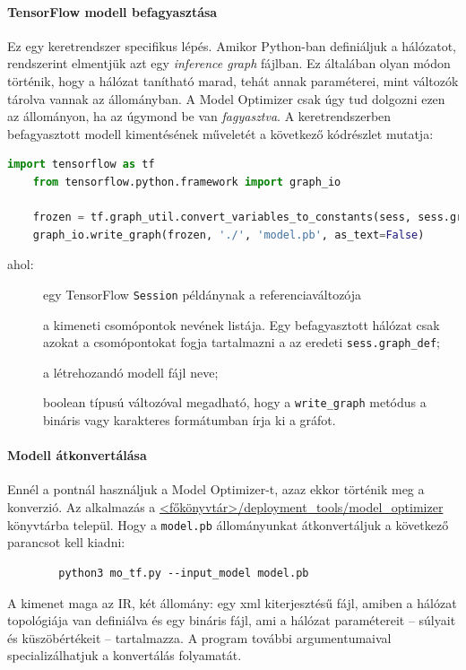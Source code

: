 \paragraph*{TensorFlow modell befagyasztása}
	Ez egy keretrendszer specifikus lépés. Amikor Python-ban definiáljuk a hálózatot, rendszerint elmentjük azt egy \emph{inference graph} fájlban. Ez általában olyan módon történik, hogy a hálózat tanítható marad, tehát annak paraméterei, mint változók tárolva vannak az állományban. A Model Optimizer csak úgy tud dolgozni ezen az állományon, ha az úgymond be van \emph{fagyasztva}. A keretrendszerben befagyasztott modell kimentésének műveletét a következő kódrészlet mutatja:
	\begin{lstlisting}[language=Python]
	import tensorflow as tf
	from tensorflow.python.framework import graph_io
	
	frozen = tf.graph_util.convert_variables_to_constants(sess, sess.graph_def, ["output_node"])
	graph_io.write_graph(frozen, './', 'model.pb', as_text=False)
	\end{lstlisting}
	ahol:
	\begin{description}
		\item[] egy TensorFlow \verb|Session| példánynak a referenciaváltozója
		\item[] a kimeneti csomópontok nevének listája. Egy befagyasztott hálózat csak azokat a csomópontokat fogja tartalmazni a az eredeti \verb|sess.graph_def|;
		\item[] a létrehozandó modell fájl neve;
		\item[] boolean típusú változóval megadható, hogy a \verb|write_graph| metódus a bináris vagy karakteres formátumban írja ki a gráfot.
	\end{description}

\paragraph*{Modell átkonvertálása}
	Ennél a pontnál használjuk a Model Optimizer-t, azaz ekkor történik meg a konverzió. Az alkalmazás a \url{<főkönyvtár>/deployment_tools/model_optimizer} könyvtárba települ. Hogy a \verb|model.pb| állományunkat átkonvertáljuk a következő parancsot kell kiadni:
	\begin{verbatim}
		python3 mo_tf.py --input_model model.pb
	\end{verbatim}
	A kimenet maga az IR, két állomány: egy xml kiterjesztésű fájl, amiben a hálózat topológiája van definiálva és egy bináris fájl, ami a hálózat paramétereit -- súlyait és küszöbértékeit -- tartalmazza. 
	A program további argumentumaival specializálhatjuk a konvertálás folyamatát.

